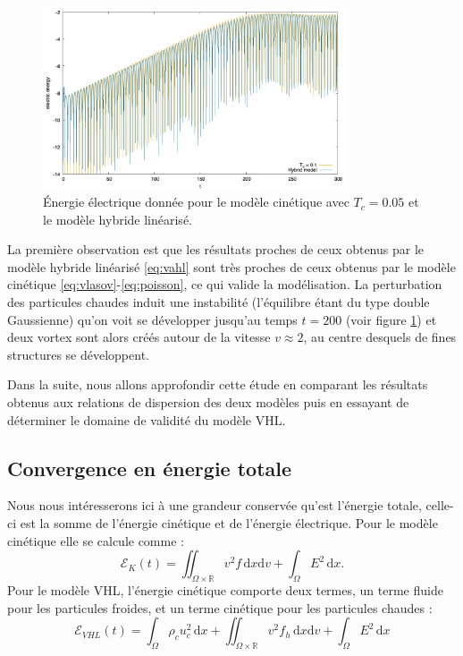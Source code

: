 \begin{figure}[h]
  \centering
  \includegraphics[width=0.8\textwidth]{img/limit_ee_Tf300.png}
  \caption{Énergie électrique donnée pour le modèle cinétique avec $T_c=0.05$ et le modèle hybride linéarisé.}
  \label{fig:limit_ee_Tf300}
\end{figure}
La premi\`ere observation est que les résultats proches de ceux obtenus par le modèle hybride linéarisé \eqref{eq:vahl}
sont tr\`es proches de ceux obtenus par le modèle cinétique \eqref{eq:vlasov}-\eqref{eq:poisson}, ce qui valide la mod\'elisation. 
La perturbation des particules chaudes induit une instabilit\'e (l'\'equilibre \'etant du type double Gaussienne) 
qu'on voit se d\'evelopper jusqu'au temps $t=200$ (voir figure \ref{fig:limit_ee_Tf300}) et deux vortex sont alors cr\'e\'es autour de la vitesse $v\approx 2$, au centre desquels de fines structures se d\'eveloppent. 

Dans la suite, nous allons approfondir cette étude en comparant les r\'esultats obtenus aux relations de dispersion des deux modèles 
puis en essayant de d\'eterminer le domaine de validit\'e du mod\`ele VHL.  



\subsection{Convergence en énergie totale}

Nous nous intéresserons ici à une grandeur conservée qu'est l'énergie totale, celle-ci est la somme de l'énergie cinétique et de l'énergie électrique. Pour le modèle cinétique elle se calcule comme :
$$
  \mathcal{E}_K(t) = \iint_{\Omega\times\mathbb{R}} v^2 f\,\mathrm{d}x\mathrm{d}v + \int_{\Omega} E^2\,\mathrm{d}x. 
$$
Pour le modèle VHL, l'énergie cinétique comporte deux termes, un terme fluide pour les particules froides, et un terme cinétique pour les particules chaudes :
$$
  \mathcal{E}_{VHL}(t) = \int_\Omega \rho_c u_c^2\,\mathrm{d}x + \iint_{\Omega\times\mathbb{R}}v^2f_h\,\mathrm{d}x\mathrm{d}v + \int_\Omega E^2\,\mathrm{d}x
$$

